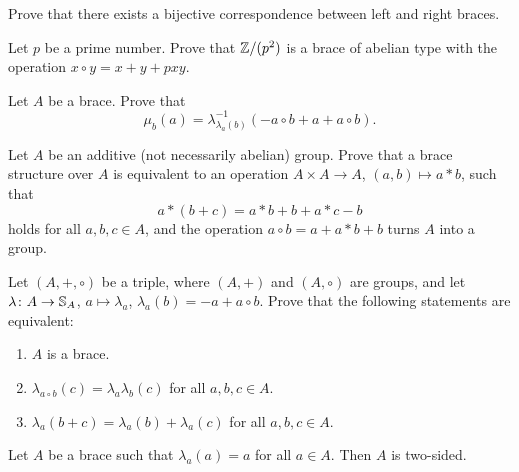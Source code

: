 
\begin{prob}
\label{prob:left_right}
    Prove that there exists a bijective correspondence between left and right braces. 
\end{prob}

\begin{prob}
Let $p$ be a prime number. Prove that $\mathbb{Z}/(p^2)$ is a brace of abelian type with
the operation $x\circ y=x+y+pxy$. 
\end{prob}

\begin{prob}
Let $A$ be a brace. 
Prove that 
\[
\mu_b(a)=\lambda^{-1}_{\lambda_a(b)}(-a\circ b+a+a\circ b).
\]
\end{prob}

\begin{prob}
\label{prob:star}
Let $A$ be an additive (not necessarily abelian) group.  
Prove that a brace structure over $A$ is equivalent to an operation $A\times A\to
A$, $(a,b)\mapsto a*b$, such that 
\[
a*(b+c)=a*b+b+a*c-b
\]
holds for all $a,b,c\in A$, and the operation $a\circ b=a+a*b+b$ turns $A$
into a group. 
\end{prob}

\begin{prob}
\label{prob:equivalences}
	Let $(A,+,\circ)$ be a triple, where 
	$(A,+)$ and $(A,\circ)$ are
	groups, and let $\lambda\colon A\to\mathbb{S}_A$, $a\mapsto\lambda_a$, $\lambda_a(b)=-a+a\circ b$. 
	Prove that the following statements are equivalent:
	\begin{enumerate}
		\item $A$ is a brace.
		\item $\lambda_{a\circ b}(c)=\lambda_a\lambda_b(c)$ for all $a,b,c\in A$.
		\item $\lambda_a(b+c)=\lambda_a(b)+\lambda_a(c)$ for all $a,b,c\in A$.
	\end{enumerate}
\end{prob}

\begin{prob}
\label{prob:2sided}
	Let $A$ be a brace such that $\lambda_a(a)=a$ for all $a\in A$.
	Then $A$ is two-sided.
\end{prob}

